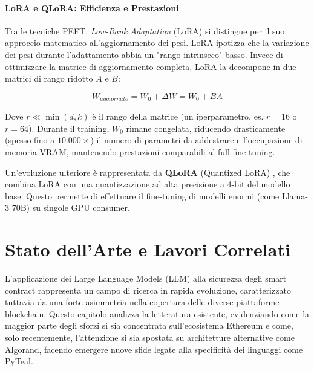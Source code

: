 \subsubsection{LoRA e QLoRA: Efficienza e Prestazioni}
Tra le tecniche PEFT, \textit{Low-Rank Adaptation} (LoRA) \cite{hu2021lora} si distingue per il suo approccio matematico all'aggiornamento dei pesi. LoRA ipotizza che la variazione dei pesi durante l'adattamento abbia un "rango intrinseco" basso.
Invece di ottimizzare la matrice di aggiornamento completa, LoRA la decompone in due matrici di rango ridotto $A$ e $B$:

\begin{equation}
W_{aggiornato} = W_0 + \Delta W = W_0 + BA
\end{equation}

Dove $r \ll \min(d, k)$ è il rango della matrice (un iperparametro, es. $r=16$ o $r=64$). Durante il training, $W_0$ rimane congelata, riducendo drasticamente (spesso fino a $10.000\times$) il numero di parametri da addestrare e l'occupazione di memoria VRAM, mantenendo prestazioni comparabili al full fine-tuning.

Un'evoluzione ulteriore è rappresentata da \textbf{QLoRA} (Quantized LoRA) \cite{dettmers2023qlora}, che combina LoRA con una quantizzazione ad alta precisione a 4-bit del modello base. Questo permette di effettuare il fine-tuning di modelli enormi (come Llama-3 70B) su singole GPU consumer.

\chapter{Stato dell'Arte e Lavori Correlati}
\label{chap:state_of_the_art}

L'applicazione dei Large Language Models (LLM) alla sicurezza degli smart contract rappresenta un campo di ricerca in rapida evoluzione, caratterizzato tuttavia da una forte asimmetria nella copertura delle diverse piattaforme blockchain. Questo capitolo analizza la letteratura esistente, evidenziando come la maggior parte degli sforzi si sia concentrata sull'ecosistema Ethereum e come, solo recentemente, l'attenzione si sia spostata su architetture alternative come Algorand, facendo emergere nuove sfide legate alla specificità dei linguaggi come PyTeal.

